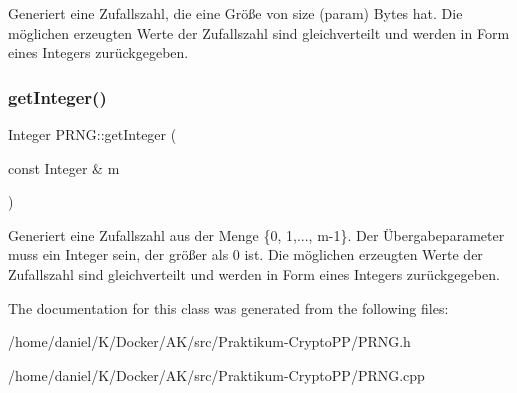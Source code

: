 Generiert eine Zufallszahl, die eine Größe von size (param) Bytes hat. Die möglichen erzeugten Werte der Zufallszahl sind gleichverteilt und werden in Form eines Integers zurückgegeben. \mbox{\label{classPRNG_af9eb9406a3ba8308447a125c1f24d7df}} 
\subsubsection{\texorpdfstring{get\+Integer()}{getInteger()}\hspace{0.1cm}{\footnotesize\ttfamily [2/2]}}
{\footnotesize\ttfamily Integer P\+R\+N\+G\+::get\+Integer (\begin{DoxyParamCaption}\item[{const Integer \&}]{m }\end{DoxyParamCaption})\hspace{0.3cm}{\ttfamily [virtual]}}

Generiert eine Zufallszahl aus der Menge \{0, 1,..., m-\/1\}. Der Übergabeparameter muss ein Integer sein, der größer als 0 ist. Die möglichen erzeugten Werte der Zufallszahl sind gleichverteilt und werden in Form eines Integers zurückgegeben. 

The documentation for this class was generated from the following files\+:\begin{DoxyCompactItemize}
\item 
/home/daniel/\+K/\+Docker/\+A\+K/src/\+Praktikum-\/\+Crypto\+P\+P/P\+R\+N\+G.\+h\item 
/home/daniel/\+K/\+Docker/\+A\+K/src/\+Praktikum-\/\+Crypto\+P\+P/P\+R\+N\+G.\+cpp\end{DoxyCompactItemize}
